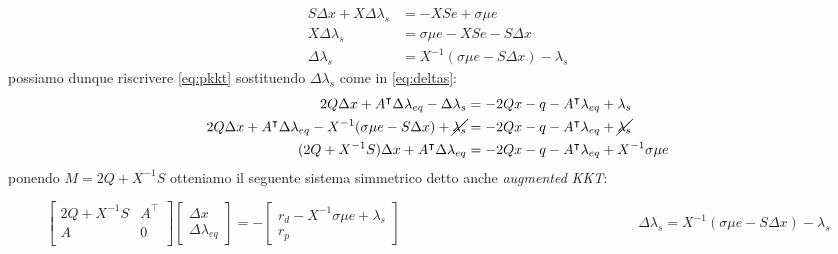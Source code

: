 \begin{equation} \label{eq:deltas}
\begin{split}
    S\Delta x + X \Delta \lambda_s &= -XSe + \sigma \mu e\\
    X \Delta \lambda_s &=\sigma \mu e -XSe -S\Delta x\\
    \Delta \lambda_s &= X^{-1}(\sigma \mu e - S\Delta x) - \lambda_s
\end{split}
\end{equation}
possiamo dunque riscrivere \ref{eq:pkkt} sostituendo $\Delta \lambda_s$ come in \ref{eq:deltas}:
\begin{equation}\label{eq:deltax}
    \begin{split}
        2Q\Delta x + A^\intercal \Delta \lambda_{eq} - \Delta \lambda_s &= -2Qx-q-A^\intercal \lambda_{eq} +\lambda_s\\
        2Q\Delta x + A^\intercal \Delta \lambda_{eq} - X^{-1}(\sigma \mu e - S\Delta x) + \cancel{\lambda_s} &= -2Qx-q-A^\intercal \lambda_{eq} + \cancel{\lambda_s}\\
        (2Q +X^{-1}S)\Delta x + A^\intercal \Delta \lambda_{eq} &= -2Qx -q -A^\intercal \lambda_{eq} + X^{-1} \sigma \mu e
    \end{split}
\end{equation}
ponendo $M=2Q + X^{-1}S$ otteniamo il seguente sistema simmetrico detto anche \emph{augmented KKT}:

\begin{subequations}\label{eq:aguKKT}
\begin{equation} \label{eq:pkkt2}
\begin{bmatrix}
2Q +X^{-1}S & A^\intercal\\
A & 0 \\
\end{bmatrix}\begin{bmatrix}\Delta x \\ \Delta \lambda_{eq}\end{bmatrix}= -
\begin{bmatrix}
    r_d-X^{-1}\sigma \mu e + \lambda_s\\r_p
\end{bmatrix}
\end{equation}
\begin{equation} \label{eq:dds}
\;\;\;\;\;\;\;\;\;\;\;\;\;\;\;\;\;\;\;\;\;\;\;\;\;\;\;\;\;\;\;\;\;\;\;\;\;\;\;\;\;\;\;\;\;\;\;\;\;\;\;\;\;\;\;\;\;\;\;\;\;\Delta \lambda_s = X^{-1}(\sigma \mu e - S\Delta x) - \lambda_s
\end{equation}
\end{subequations}

